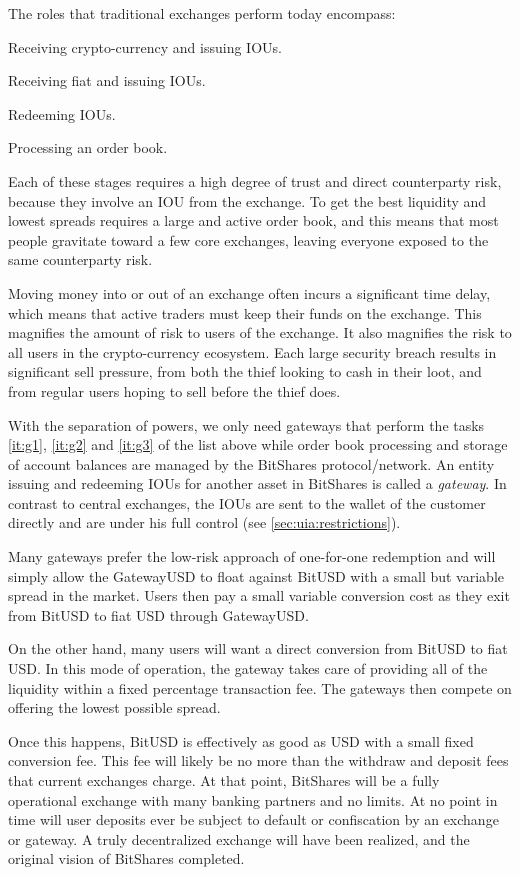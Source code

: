 \label{sec:gateway}

The roles that traditional exchanges perform today encompass:

\begin{compactenum}
 \item \label{it:g1} Receiving crypto-currency and issuing IOUs.
 \item \label{it:g2} Receiving fiat and issuing IOUs.
 \item \label{it:g3} Redeeming IOUs.
 \item \label{it:g4} Processing an order book.
\end{compactenum}

Each of these stages requires a high degree of trust and direct counterparty
risk, because they involve an IOU from the exchange. To get the best
liquidity and lowest spreads requires a large and active order book, and this
means that most people gravitate toward a few core exchanges, leaving everyone
exposed to the same counterparty risk.

Moving money into or out of an exchange often incurs a significant time delay,
which means that active traders must keep their funds on the exchange. This
magnifies the amount of risk to users of the exchange. It also magnifies the
risk to all users in the crypto-currency ecosystem. Each large security breach
results in significant sell pressure, from both the thief looking to cash in
their loot, and from regular users hoping to sell before the thief does.

\medskip

With the separation of powers, we only need gateways that perform the tasks
\ref{it:g1}, \ref{it:g2} and \ref{it:g3} of the list above while order book
processing and storage of account balances are managed by the BitShares
protocol/network. An entity issuing and redeeming IOUs for another asset in
BitShares is called a \emph{gateway}. In contrast to central exchanges, the
IOUs are sent to the wallet of the customer directly and are under his full
control (see \cref{sec:uia:restrictions}).

Many gateways prefer the low-risk approach of one-for-one redemption and will
simply allow the GatewayUSD to float against BitUSD with a small but variable
spread in the market. Users then pay a small variable conversion cost as they
exit from BitUSD to fiat USD through GatewayUSD.

On the other hand, many users will want a direct conversion from BitUSD to fiat
USD. In this mode of operation, the gateway takes care of providing all of the
liquidity within a fixed percentage transaction fee. The gateways then
compete on offering the lowest possible spread.

Once this happens, BitUSD is effectively as good as USD with a small fixed
conversion fee. This fee will likely be no more than the withdraw and deposit
fees that current exchanges charge. At that point, BitShares will be a fully
operational exchange with many banking partners and no limits. At no point in
time will user deposits ever be subject to default or confiscation by an
exchange or gateway. A truly decentralized exchange will have been realized,
and the original vision of BitShares completed.

